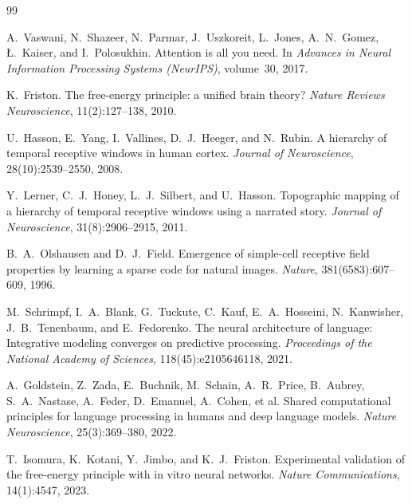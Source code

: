 \documentclass{article}
\begin{document}
\begin{thebibliography}{99}

A.\ Vaswani, N.\ Shazeer, N.\ Parmar, J.\ Uszkoreit, L.\ Jones, A.\ N.\ Gomez,
\L.\ Kaiser, and I.\ Polosukhin.
\newblock Attention is all you need.
\newblock In \emph{Advances in Neural Information Processing Systems (NeurIPS)},
volume~30, 2017.

K.\ Friston.
\newblock The free-energy principle: a unified brain theory?
\newblock \emph{Nature Reviews Neuroscience}, 11(2):127--138, 2010.

U.\ Hasson, E.\ Yang, I.\ Vallines, D.\ J.\ Heeger, and N.\ Rubin.
\newblock A hierarchy of temporal receptive windows in human cortex.
\newblock \emph{Journal of Neuroscience}, 28(10):2539--2550, 2008.

Y.\ Lerner, C.\ J.\ Honey, L.\ J.\ Silbert, and U.\ Hasson.
\newblock Topographic mapping of a hierarchy of temporal receptive windows
using a narrated story.
\newblock \emph{Journal of Neuroscience}, 31(8):2906--2915, 2011.

B.\ A.\ Olshausen and D.\ J.\ Field.
\newblock Emergence of simple-cell receptive field properties by learning a
sparse code for natural images.
\newblock \emph{Nature}, 381(6583):607--609, 1996.

M.\ Schrimpf, I.\ A.\ Blank, G.\ Tuckute, C.\ Kauf, E.\ A.\ Hosseini,
N.\ Kanwisher, J.\ B.\ Tenenbaum, and E.\ Fedorenko.
\newblock The neural architecture of language: Integrative modeling converges
on predictive processing.
\newblock \emph{Proceedings of the National Academy of Sciences},
118(45):e2105646118, 2021.

A.\ Goldstein, Z.\ Zada, E.\ Buchnik, M.\ Schain, A.\ R.\ Price, B.\ Aubrey,
S.\ A.\ Nastase, A.\ Feder, D.\ Emanuel, A.\ Cohen, et al.
\newblock Shared computational principles for language processing in humans and
deep language models.
\newblock \emph{Nature Neuroscience}, 25(3):369--380, 2022.

T.\ Isomura, K.\ Kotani, Y.\ Jimbo, and K.\ J.\ Friston.
\newblock Experimental validation of the free-energy principle with in vitro
neural networks.
\newblock \emph{Nature Communications}, 14(1):4547, 2023.


\end{thebibliography}
\end{document}
